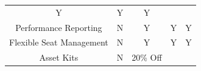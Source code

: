\documentclass[12pt]{article}
\begin{document}
\begin{longtable}[]{@{}ccccc@{}}
\begin{minipage}[t]{0.14\columnwidth}
Y\strut
\end{minipage} & \begin{minipage}[t]{0.14\columnwidth}\centering\strut
Y\strut
\end{minipage} & \begin{minipage}[t]{0.23\columnwidth}\centering\strut
Y\strut
\end{minipage}\tabularnewline
\begin{minipage}[t]{0.18\columnwidth}\centering\strut
Performance Reporting\strut
\end{minipage} & \begin{minipage}[t]{0.18\columnwidth}\centering\strut
N\strut
\end{minipage} & \begin{minipage}[t]{0.14\columnwidth}\centering\strut
Y\strut
\end{minipage} & \begin{minipage}[t]{0.14\columnwidth}\centering\strut
Y\strut
\end{minipage} & \begin{minipage}[t]{0.23\columnwidth}\centering\strut
Y\strut
\end{minipage}\tabularnewline
\begin{minipage}[t]{0.18\columnwidth}\centering\strut
Flexible Seat Management\strut
\end{minipage} & \begin{minipage}[t]{0.18\columnwidth}\centering\strut
N\strut
\end{minipage} & \begin{minipage}[t]{0.14\columnwidth}\centering\strut
Y\strut
\end{minipage} & \begin{minipage}[t]{0.14\columnwidth}\centering\strut
Y\strut
\end{minipage} & \begin{minipage}[t]{0.23\columnwidth}\centering\strut
Y\strut
\end{minipage}\tabularnewline
\begin{minipage}[t]{0.18\columnwidth}\centering\strut
Asset Kits\strut
\end{minipage} & \begin{minipage}[t]{0.18\columnwidth}\centering\strut
N\strut
\end{minipage} & \begin{minipage}[t]{0.14\columnwidth}\centering\strut
20\% Off\strut
\end{minipage} & \begin{minipage}[t]{0.14\columnwidth}\centering\strut

\end{minipage}
\end{longtable}
\end{document}

